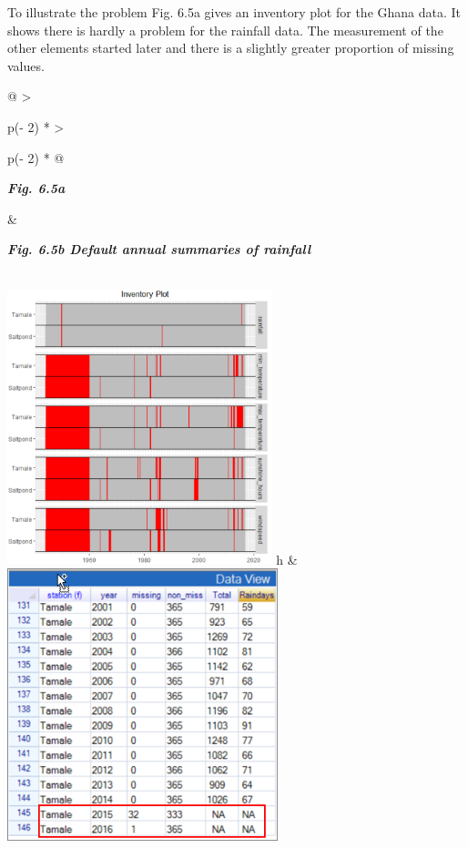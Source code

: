 \documentclass[
  letterpaper,
  DIV=11,
  numbers=noendperiod]{scrreprt}
\begin{document}
To illustrate the problem Fig. 6.5a gives an inventory plot for the
Ghana data. It shows there is hardly a problem for the rainfall data.
The measurement of the other elements started later and there is a
slightly greater proportion of missing values.

\begin{longtable}[]{@{}
  >{\raggedright\arraybackslash}p{(\columnwidth - 2\tabcolsep) * }
  >{\raggedright\arraybackslash}p{(\columnwidth - 2\tabcolsep) * }@{}}
\toprule\noalign{}
\begin{minipage}[b]{\linewidth}\raggedright
\textbf{\emph{Fig. 6.5a}}
\end{minipage} & \begin{minipage}[b]{\linewidth}\raggedright
\textbf{\emph{Fig. 6.5b Default annual summaries of rainfall}}
\end{minipage} \\
\midrule\noalign{}
\endhead
\bottomrule\noalign{}
\endlastfoot
\includegraphics[width=3.02824in,height=3.14148in]{figures/Fig6.5a.png}
h &
\includegraphics[width=3.09181in,height=\textheight]{figures/Fig6.5b.png} \\
\end{longtable}
\end{document}
